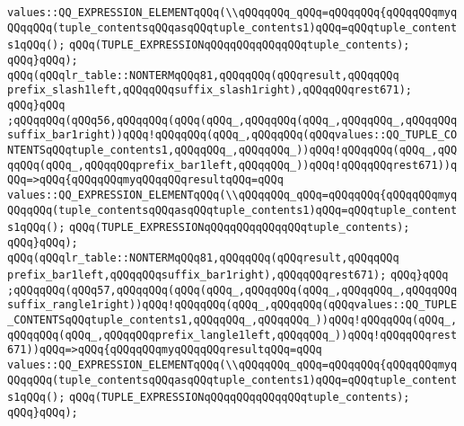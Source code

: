 \verb|values::QQ_EXPRESSION_ELEMENTqQQq(\\qQQqqQQq_qQQq=qQQqqQQq{qQQqqQQqmyqQQqqQQq(tuple_contentsqQQqasqQQqtuple_contents1)qQQq=qQQqtuple_contents1qQQq();|\newline
\verb|qQQq(TUPLE_EXPRESSIONqQQqqQQqqQQqqQQqtuple_contents);|\newline
\verb|qQQq}qQQq);|\newline
\verb|qQQq(qQQqlr_table::NONTERMqQQq81,qQQqqQQq(qQQqresult,qQQqqQQq|\newline
\verb|prefix_slash1left,qQQqqQQqsuffix_slash1right),qQQqqQQqrest671);|\newline
\verb|qQQq}qQQq|\newline
\verb|;qQQqqQQq(qQQq56,qQQqqQQq(qQQq(qQQq_,qQQqqQQq(qQQq_,qQQqqQQq_,qQQqqQQqsuffix_bar1right))qQQq!qQQqqQQq(qQQq_,qQQqqQQq(qQQqvalues::QQ_TUPLE_CONTENTSqQQqtuple_contents1,qQQqqQQq_,qQQqqQQq_))qQQq!qQQqqQQq(qQQq_,qQQqqQQq(qQQq_,qQQqqQQqprefix_bar1left,qQQqqQQq_))qQQq!qQQqqQQqrest671))qQQq=>qQQq{qQQqqQQqmyqQQqqQQqresultqQQq=qQQq|\newline
\verb|values::QQ_EXPRESSION_ELEMENTqQQq(\\qQQqqQQq_qQQq=qQQqqQQq{qQQqqQQqmyqQQqqQQq(tuple_contentsqQQqasqQQqtuple_contents1)qQQq=qQQqtuple_contents1qQQq();|\newline
\verb|qQQq(TUPLE_EXPRESSIONqQQqqQQqqQQqqQQqtuple_contents);|\newline
\verb|qQQq}qQQq);|\newline
\verb|qQQq(qQQqlr_table::NONTERMqQQq81,qQQqqQQq(qQQqresult,qQQqqQQq|\newline
\verb|prefix_bar1left,qQQqqQQqsuffix_bar1right),qQQqqQQqrest671);|\newline
\verb|qQQq}qQQq|\newline
\verb|;qQQqqQQq(qQQq57,qQQqqQQq(qQQq(qQQq_,qQQqqQQq(qQQq_,qQQqqQQq_,qQQqqQQqsuffix_rangle1right))qQQq!qQQqqQQq(qQQq_,qQQqqQQq(qQQqvalues::QQ_TUPLE_CONTENTSqQQqtuple_contents1,qQQqqQQq_,qQQqqQQq_))qQQq!qQQqqQQq(qQQq_,qQQqqQQq(qQQq_,qQQqqQQqprefix_langle1left,qQQqqQQq_))qQQq!qQQqqQQqrest671))qQQq=>qQQq{qQQqqQQqmyqQQqqQQqresultqQQq=qQQq|\newline
\verb|values::QQ_EXPRESSION_ELEMENTqQQq(\\qQQqqQQq_qQQq=qQQqqQQq{qQQqqQQqmyqQQqqQQq(tuple_contentsqQQqasqQQqtuple_contents1)qQQq=qQQqtuple_contents1qQQq();|\newline
\verb|qQQq(TUPLE_EXPRESSIONqQQqqQQqqQQqqQQqtuple_contents);|\newline
\verb|qQQq}qQQq);|\newline
